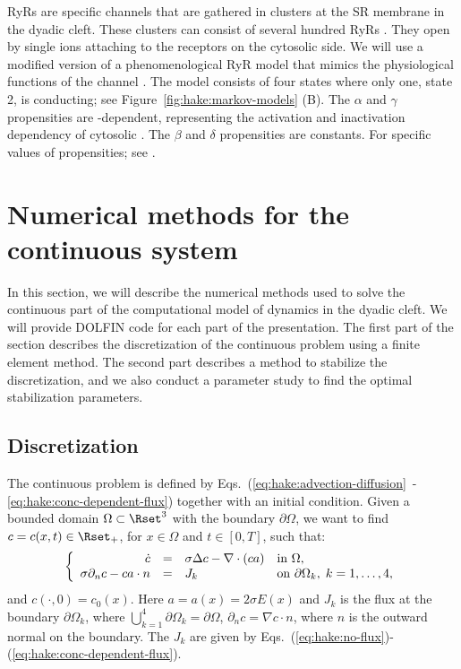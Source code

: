 RyRs are \Ca specific channels that are gathered in clusters at the SR
membrane in the dyadic cleft. These clusters can consist of several
hundred RyRs
\citep{BeuckelmannWier1988,Franzini-ArmstrongProtasiRamesh1999}. They
open by single \Ca ions attaching to the receptors on the cytosolic
side. We will use a modified version of a phenomenological RyR model
that mimics the physiological functions of the channel
\citep{SternSongEtAl1999}. The model consists of four states where only
one, state 2, is conducting; see Figure~\ref{fig:hake:markov-models}
(B). The $\alpha$ and $\gamma$ propensities are \Ca-dependent,
representing the activation and inactivation dependency of cytosolic
\CaC. The $\beta$ and $\delta$ propensities are constants. For
specific values of propensities; see \citet{SternSongEtAl1999}.

\section{Numerical methods for the continuous system}

In this section, we will describe the numerical methods used to solve
the continuous part of the computational model of \Ca dynamics in the
dyadic cleft. We will provide DOLFIN code for each part of the
presentation. The first part of the section describes the
discretization of the continuous problem using a finite element
method. The second part describes a method to stabilize the
discretization, and we also conduct a parameter study to find the
optimal stabilization parameters.


\subsection{Discretization}
\label{sec:hake:discretization}

The continuous problem is defined by
Eqs.~(\ref{eq:hake:advection-diffusion}~-\ref{eq:hake:conc-dependent-flux})
together with an initial condition. Given a bounded domain $\Omega
\subset \Rset^3$ with the boundary $\partial\Omega$, we want to find
$c = c(x,t) \in \Rset_+$, for $x\in \Omega$ and $t \in [0,T]$, such
that:
\begin{equation}
\label{eq:hake:full_system}
\left\{
  \begin{array}{r@{\quad=\quad}ll}
    \dot{c}&\sigma\Delta c - \nabla\cdot\left(ca\right)&  \text{in } \Omega, \\
    \sigma\partial_nc-ca\cdot n&J_k& \text{on } \partial\Omega_k,\; k = 1,\ldots,4,
  \end{array}
\right.
\end{equation}
and $c(\cdot,0) = c_0(x)$. Here $a=a(x)=2\sigma E(x)$ and $J_k$ is the
\kth flux at the \kth boundary $\partial\Omega_k$, where
$\bigcup^4_{k=1}\partial\Omega_k=\partial\Omega$, $\partial_nc =
\nabla c\cdot n$, where $n$ is the outward normal on the boundary. The
$J_k$ are given by
Eqs.~(\ref{eq:hake:no-flux})-(\ref{eq:hake:conc-dependent-flux}).

